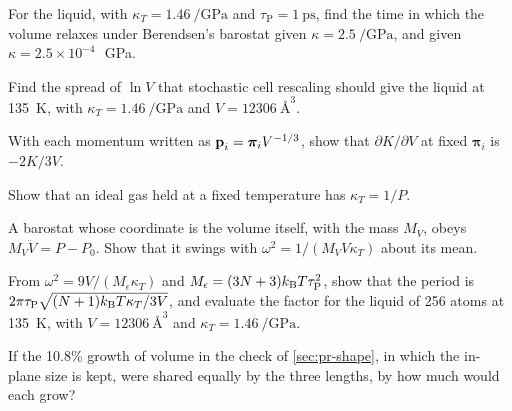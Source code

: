 \begin{exercise}
\label{ex:pr-relax}
For the liquid, with $\kappa_T = \SI{1.46}{\per\giga\pascal}$ and
$\tau_{\mathrm P} = \SI{1}{\pico\second}$, find the time in which the volume
relaxes under Berendsen's barostat given $\kappa = \SI{2.5}{\per\giga
\pascal}$, and given $\kappa = 2.5\times10^{-4}$\,\si{\per\giga\pascal}.
\end{exercise}

\begin{exercise}
\label{ex:pr-logspread}
Find the spread of $\ln V$ that stochastic cell rescaling should give the
liquid at \SI{135}{\kelvin}, with $\kappa_T = \SI{1.46}{\per\giga\pascal}$
and $V = \SI{12306}{\angstrom\cubed}$.
\end{exercise}

\begin{exercise}
\label{ex:pr-kinetic}
With each momentum written as $\bm{\mathrm{p}}_i = \boldsymbol{\pi}_i V^{-1/3}$,
show that $\partial K/\partial V$ at fixed $\boldsymbol{\pi}_i$ is
$-2K/3V$.
\end{exercise}

\begin{exercise}
\label{ex:pr-gas-kappa}
Show that an ideal gas held at a fixed temperature has $\kappa_T = 1/P$.
\end{exercise}

\begin{exercise}
\label{ex:pr-andersen}
A barostat whose coordinate is the volume itself, with the mass
$M_V$, obeys $M_V\ddot V = P - P_0$. Show that it swings with $\omega^2 =
1/(M_VV\kappa_T)$ about its mean.
\end{exercise}

\begin{exercise}
\label{ex:pr-period}
From $\omega^2 = 9V/(M_\epsilon\kappa_T)$ and $M_\epsilon = (3N + 3)k_{\mathrm{B}} T
\tau_{\mathrm P}^2$, show that the period is $2\pi\tau_{\mathrm P}
\sqrt{(N + 1)k_{\mathrm{B}} T\kappa_T/3V}$, and evaluate the factor for the liquid
of 256 atoms at \SI{135}{\kelvin}, with $V = \SI{12306}{\angstrom\cubed}$
and $\kappa_T = \SI{1.46}{\per\giga\pascal}$.
\end{exercise}

\begin{exercise}
\label{ex:pr-graphite}
If the 10.8\% growth of volume in the check of \cref{sec:pr-shape}, in
which the in-plane size is kept, were shared equally by the three lengths,
by how much would each grow?
\end{exercise}

